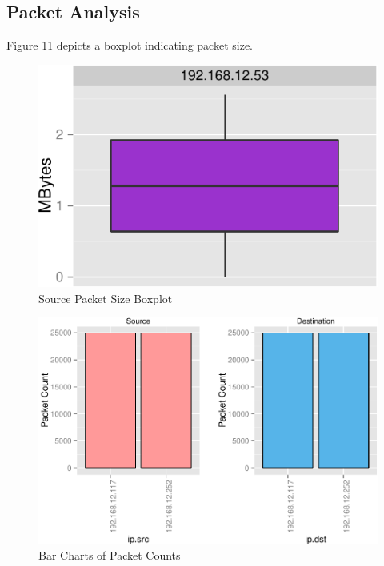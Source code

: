 \documentclass[12pt,]{article}
\begin{document}
\subsection{Packet Analysis}\label{packet-analysis}

Figure 11 depicts a boxplot indicating packet size.

\begin{figure}

{\centering \includegraphics{thesis_files/figure-latex/unnamed-chunk-19-1} 

}

\caption{Source Packet Size Boxplot}\label{fig:unnamed-chunk-19}
\end{figure}

\clearpage

\begin{figure}

{\centering \includegraphics{thesis_files/figure-latex/unnamed-chunk-20-1} 

}

\caption{Bar Charts of Packet Counts}\label{fig:unnamed-chunk-20}
\end{figure}
\end{document}
